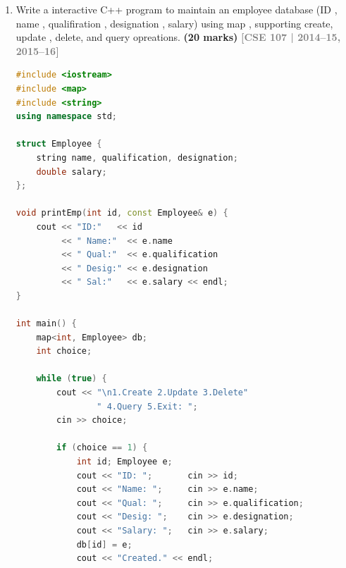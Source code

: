 \documentclass[12pt,a3paper]{article}
\newcommand{\yr}[1]{\hfill\textcolor{gray}{\small\textbf{[#1]}}}
\newcommand{\mk}[1]{\textcolor{orange!70!black}{\small\textbf{(#1 marks)}}}
\begin{document}
\begin{enumerate}
\begin{tcolorbox}
\begin{lstlisting}[language=C++]
int main(){
    map<int, student> db;

    // (i) Insert student info from keyboard
    int n; cout<<"How many students? "; cin>>n;
    for(int i=0;i<n;i++){
        int    id; string name; double cgpa; int year;
        cout<<"ID: ";    cin>>id;
        cout<<"Name: ";  cin>>name;
        cout<<"CGPA: ";  cin>>cgpa;
        cout<<"Year: ";  cin>>year;
        db[id] = student(name, cgpa, year);
    }

    // (ii) Query by ID
    int qid; cout<<"Enter stdID to search: "; cin>>qid;
    if(db.count(qid)) db[qid].print();
    else cout<<"Student not found.\n";

    return 0;
}
\end{lstlisting}

\end{tcolorbox}

\item Write a interactive C++ program to maintain an employee database (ID , name , qualifiration , designation , salary) using map , supporting create, update , delete, and query opreations. \mk{20}
\yr{CSE 107 | 2014--15, 2015--16}

\begin{tcolorbox}[enhanced,breakable,ansbox,
  colback=cH!4,colframe=cH,boxrule=0.8pt,arc=5pt,
  title={\textbf{Answer --- Interactive Employee Database Using map}},
  fonttitle=\bfseries\color{white},colbacktitle=cH]
\begin{lstlisting}[language=C++]
#include <iostream>
#include <map>
#include <string>
using namespace std;

struct Employee {
    string name, qualification, designation;
    double salary;
};

void printEmp(int id, const Employee& e) {
    cout << "ID:"   << id
         << " Name:"  << e.name
         << " Qual:"  << e.qualification
         << " Desig:" << e.designation
         << " Sal:"   << e.salary << endl;
}

int main() {
    map<int, Employee> db;
    int choice;

    while (true) {
        cout << "\n1.Create 2.Update 3.Delete"
                " 4.Query 5.Exit: ";
        cin >> choice;

        if (choice == 1) {
            int id; Employee e;
            cout << "ID: ";       cin >> id;
            cout << "Name: ";     cin >> e.name;
            cout << "Qual: ";     cin >> e.qualification;
            cout << "Desig: ";    cin >> e.designation;
            cout << "Salary: ";   cin >> e.salary;
            db[id] = e;
            cout << "Created." << endl;


\end{lstlisting}
\end{tcolorbox}
\end{enumerate}
\end{document}
